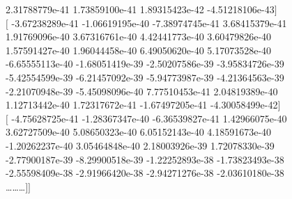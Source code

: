 \documentclass{article}
\begin{document}
    2.31788779e-41   1.73859100e-41   1.89315423e-42  -4.51218106e-43$]$\\
 $[$ -3.67238289e-41  -1.06619195e-40  -7.38974745e-41   3.68415379e-41 \\
 1.91769096e-40   3.67316761e-40   4.42441773e-40   3.60479826e-40\\
    1.57591427e-40   1.96044458e-40   6.49050620e-40   5.17073528e-40\\
   -6.65555113e-40  -1.68051419e-39  -2.50207586e-39  -3.95834726e-39\\
   -5.42554599e-39  -6.21457092e-39  -5.94773987e-39  -4.21364563e-39\\
   -2.21070948e-39  -5.45098096e-40   7.77510453e-41   2.04819389e-40\\
    1.12713442e-40   1.72317672e-41  -1.67497205e-41  -4.30058499e-42$]$\\
 $[$ -4.75628725e-41  -1.28367347e-40  -6.36539827e-41   1.42966075e-40\\
    3.62727509e-40   5.08650323e-40   6.05152143e-40   4.18591673e-40\\
   -1.20262237e-40   3.05464848e-40   2.18003926e-39   1.72078330e-39\\
   -2.77900187e-39  -8.29900518e-39  -1.22252893e-38  -1.73823493e-38\\
   -2.55598409e-38  -2.91966420e-38  -2.94271276e-38  -2.03610180e-38\\
 \dots \dots \dots $]]$\\
 \newpage
 

\end{document}
